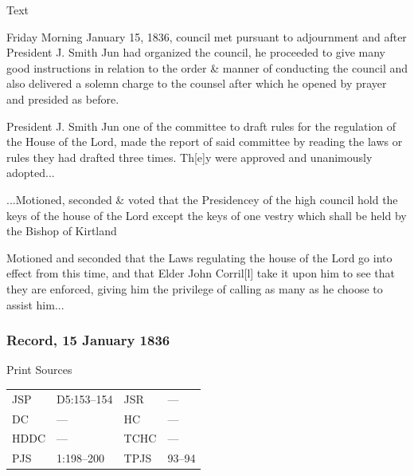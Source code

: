 				\begin{description}
					\item[Text]
				\end{description}
				
					Friday Morning January 15, 1836, council met pursuant to adjournment and after President J. Smith Jun had organized the council, he proceeded to give many good instructions in relation to the order \& manner of conducting the council and also delivered a solemn charge to the counsel after which he opened by prayer and presided as before.
					
					President J. Smith Jun one of the committee to draft rules for the regulation of the House of the Lord, made the report of said committee by reading the laws or rules they had drafted three times. Th[e]y were approved and unanimously adopted...
					
					...Motioned, seconded \& voted that the Presidencey of the high council hold the keys of the house of the Lord except the keys of one vestry which shall be held by the Bishop of Kirtland
					
					Motioned and seconded that the Laws regulating the house of the Lord go into effect from this time, and that Elder John Corril[l] take it upon him to see that they are enforced, giving him the privilege of calling as many as he choose to assist him...
					
		\subsubsection{Record, 15 January 1836}
			\label{EMS-1836-JS-15-JAN-1836-REC}
			
			\begin{description}
					\item[Print Sources]
				\end{description}

					\begin{tabular}{p{0.5in}p{1in}p{0.5in}p{1in}}
					JSP	 	& D5:153--154		& JSR 		& --- \\
					DC	 	& ---				& HC 		& --- \\
					HDDC 	& ---				& TCHC 		& --- \\
					PJS 	& 1:198--200		& TPJS 		& 93--94 \\
					\end{tabular}
				
